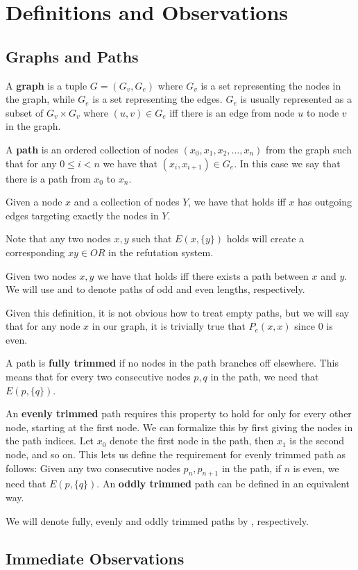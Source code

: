 \section{Definitions and Observations}
\label{sec:Definitions and Observations}
\subsection{Graphs and Paths}
\label{sub:Graphs and Paths}
\begin{definition}
  A \textbf{graph} is a tuple $G = (G_v, G_e)$ where $G_v$ is a set representing the nodes in the graph, while $G_e$ is a set representing the edges.  $G_e$ is usually represented as a subset of $G_v \times G_v$ where $(u,v) \in G_e$ iff there is an edge from node $u$ to node $v$ in the graph.
\end{definition}
\begin{definition}
  A \textbf{path} is an ordered collection of nodes $(x_0, x_1, x_2, \dots, x_n)$ from the graph such that for any $0 \leq i < n$ we have that $(x_i, x_{i+1}) \in G_e$.  In this case we say that there is a path from $x_0$ to $x_n$.
\end{definition}
\begin{definition}
  Given a node $x$ and a collection of nodes $Y$, we have that  holds iff $x$ has outgoing edges targeting exactly the nodes in $Y$.
\end{definition}
Note that any two nodes $x,y$ such that $E(x,\{y\})$ holds will create a corresponding $xy \in OR$ in the refutation system.
\begin{definition}
  Given two nodes $x,y$ we have that  holds iff there exists a path between $x$ and $y$.
  We will use  and  to denote paths of odd and even lengths, respectively.
\end{definition}
  Given this definition, it is not obvious how to treat empty paths, but we will say that for any node $x$ in our graph, it is trivially true that $P_e(x,x)$ since $0$ is even.
\begin{definition}
  A path is \textbf{fully trimmed} if no nodes in the path branches off elsewhere.
  This means that for every two consecutive nodes $p,q$ in the path, we need that $E(p,\{q\})$.
\end{definition}

An \textbf{evenly trimmed} path requires this property to hold for only for every other node, starting at the first node.
We can formalize this by first giving the nodes in the path indices.
Let $x_0$ denote the first node in the path, then $x_1$ is the second node, and so on.
This lets us define the requirement for evenly trimmed path as follows: Given any two consecutive nodes $p_n,p_{n+1}$ in the path, if $n$ is even, we need that $E(p,\{q\})$.
An \textbf{oddly trimmed} path can be defined in an equivalent way.

We will denote fully, evenly and oddly trimmed paths by , respectively.

\subsection{Immediate Observations}
\label{sub:Immediate Observations}
